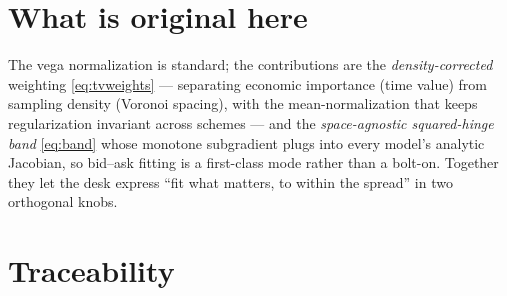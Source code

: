\documentclass[11pt]{article}
\begin{document}
\section{What is original here}
\label{sec:original}

The vega normalization is standard; the contributions are the
\emph{density-corrected} weighting \eqref{eq:tvweights} --- separating economic
importance (time value) from sampling density (Voronoi spacing), with the
mean-normalization that keeps regularization invariant across schemes --- and the
\emph{space-agnostic squared-hinge band} \eqref{eq:band} whose monotone subgradient
plugs into every model's analytic Jacobian, so bid--ask fitting is a first-class
mode rather than a bolt-on. Together they let the desk express ``fit what matters,
to within the spread'' in two orthogonal knobs.

\section{Traceability}
\label{sec:traceability}
\end{document}

